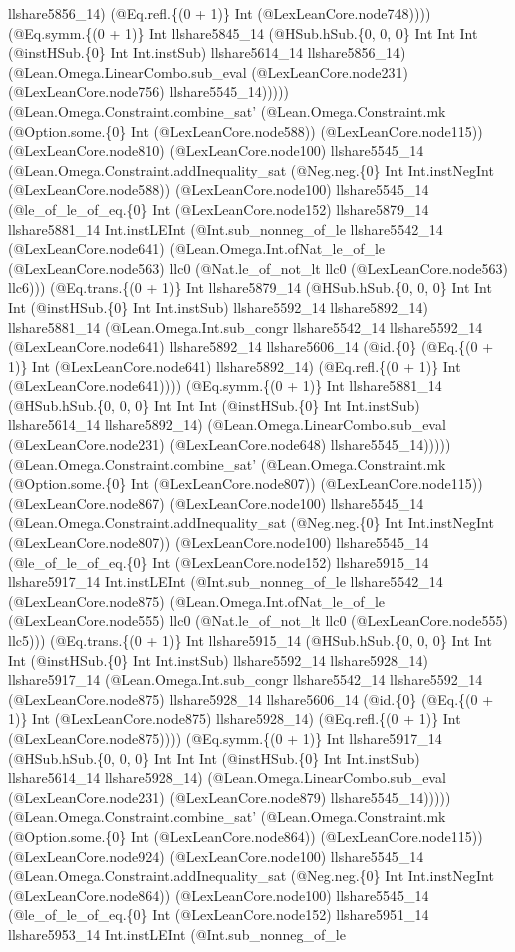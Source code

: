 \documentclass[11pt]{article}
\begin{document}
llshare5856\_14) (@Eq.refl.\{(0 + 1)\} Int (@LexLeanCore.node748)))) (@Eq.symm.\{(0 + 1)\} Int llshare5845\_14 (@HSub.hSub.\{0, 0, 0\} Int Int Int (@instHSub.\{0\} Int Int.instSub) llshare5614\_14 llshare5856\_14) (@Lean.Omega.LinearCombo.sub\_eval (@LexLeanCore.node231) (@LexLeanCore.node756) llshare5545\_14))))) (@Lean.Omega.Constraint.combine\_sat' (@Lean.Omega.Constraint.mk (@Option.some.\{0\} Int (@LexLeanCore.node588)) (@LexLeanCore.node115)) (@LexLeanCore.node810) (@LexLeanCore.node100) llshare5545\_14 (@Lean.Omega.Constraint.addInequality\_sat (@Neg.neg.\{0\} Int Int.instNegInt (@LexLeanCore.node588)) (@LexLeanCore.node100) llshare5545\_14 (@le\_of\_le\_of\_eq.\{0\} Int (@LexLeanCore.node152) llshare5879\_14 llshare5881\_14 Int.instLEInt (@Int.sub\_nonneg\_of\_le llshare5542\_14 (@LexLeanCore.node641) (@Lean.Omega.Int.ofNat\_le\_of\_le (@LexLeanCore.node563) llc0 (@Nat.le\_of\_not\_lt llc0 (@LexLeanCore.node563) llc6))) (@Eq.trans.\{(0 + 1)\} Int llshare5879\_14 (@HSub.hSub.\{0, 0, 0\} Int Int Int (@instHSub.\{0\} Int Int.instSub) llshare5592\_14 llshare5892\_14) llshare5881\_14 (@Lean.Omega.Int.sub\_congr llshare5542\_14 llshare5592\_14 (@LexLeanCore.node641) llshare5892\_14 llshare5606\_14 (@id.\{0\} (@Eq.\{(0 + 1)\} Int (@LexLeanCore.node641) llshare5892\_14) (@Eq.refl.\{(0 + 1)\} Int (@LexLeanCore.node641)))) (@Eq.symm.\{(0 + 1)\} Int llshare5881\_14 (@HSub.hSub.\{0, 0, 0\} Int Int Int (@instHSub.\{0\} Int Int.instSub) llshare5614\_14 llshare5892\_14) (@Lean.Omega.LinearCombo.sub\_eval (@LexLeanCore.node231) (@LexLeanCore.node648) llshare5545\_14))))) (@Lean.Omega.Constraint.combine\_sat' (@Lean.Omega.Constraint.mk (@Option.some.\{0\} Int (@LexLeanCore.node807)) (@LexLeanCore.node115)) (@LexLeanCore.node867) (@LexLeanCore.node100) llshare5545\_14 (@Lean.Omega.Constraint.addInequality\_sat (@Neg.neg.\{0\} Int Int.instNegInt (@LexLeanCore.node807)) (@LexLeanCore.node100) llshare5545\_14 (@le\_of\_le\_of\_eq.\{0\} Int (@LexLeanCore.node152) llshare5915\_14 llshare5917\_14 Int.instLEInt (@Int.sub\_nonneg\_of\_le llshare5542\_14 (@LexLeanCore.node875) (@Lean.Omega.Int.ofNat\_le\_of\_le (@LexLeanCore.node555) llc0 (@Nat.le\_of\_not\_lt llc0 (@LexLeanCore.node555) llc5))) (@Eq.trans.\{(0 + 1)\} Int llshare5915\_14 (@HSub.hSub.\{0, 0, 0\} Int Int Int (@instHSub.\{0\} Int Int.instSub) llshare5592\_14 llshare5928\_14) llshare5917\_14 (@Lean.Omega.Int.sub\_congr llshare5542\_14 llshare5592\_14 (@LexLeanCore.node875) llshare5928\_14 llshare5606\_14 (@id.\{0\} (@Eq.\{(0 + 1)\} Int (@LexLeanCore.node875) llshare5928\_14) (@Eq.refl.\{(0 + 1)\} Int (@LexLeanCore.node875)))) (@Eq.symm.\{(0 + 1)\} Int llshare5917\_14 (@HSub.hSub.\{0, 0, 0\} Int Int Int (@instHSub.\{0\} Int Int.instSub) llshare5614\_14 llshare5928\_14) (@Lean.Omega.LinearCombo.sub\_eval (@LexLeanCore.node231) (@LexLeanCore.node879) llshare5545\_14))))) (@Lean.Omega.Constraint.combine\_sat' (@Lean.Omega.Constraint.mk (@Option.some.\{0\} Int (@LexLeanCore.node864)) (@LexLeanCore.node115)) (@LexLeanCore.node924) (@LexLeanCore.node100) llshare5545\_14 (@Lean.Omega.Constraint.addInequality\_sat (@Neg.neg.\{0\} Int Int.instNegInt (@LexLeanCore.node864)) (@LexLeanCore.node100) llshare5545\_14 (@le\_of\_le\_of\_eq.\{0\} Int (@LexLeanCore.node152) llshare5951\_14 llshare5953\_14 Int.instLEInt (@Int.sub\_nonneg\_of\_le 
\end{document}
